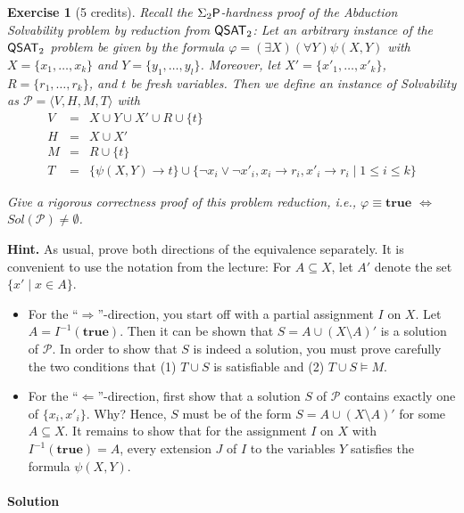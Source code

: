 \documentclass [11pt]{article}
\newcommand{\ra}{\rightarrow}
\newcommand{\Ra}{\Rightarrow}
\newcommand{\La}{\Leftarrow}
\newcommand{\LR}{\Leftrightarrow}
\renewcommand{\phi}{\varphi}
\newcommand{\ccfont}[1]{\protect\mathsf{#1}}
\newcommand{\Ptime}{\ccfont{P}}
\newcommand{\phs}[1]{\Sigma_{#1}\Ptime}
\newcommand{\QSAT}[1]{\ccfont{QSAT}_{#1}}
\newcommand{\True}{\mathbf{true}}
\newtheorem{exercise}[theorem]{Exercise}
\begin{document}
\noindent
\begin{exercise}[5 credits]
{\em 
Recall the $\phs{2}$-hardness proof of the Abduction Solvability problem by reduction from $\QSAT{2}$:
Let an arbitrary instance of the $\QSAT{2}$ problem be given by the formula 
$\phi =  (\exists X) (\forall Y) \psi(X,Y)$
with $X = \{x_1, \dots, x_k \}$ and $Y = \{y_1, \dots, y_l\}$. Moreover, let 
$X' = \{x'_1, \dots, x'_k \}$, $R = \{r_1, \dots, r_k \}$, and $t$ be fresh variables. 
Then we define an instance of Solvability as
$\mathcal{P}=\langle V,H,M,T \rangle$ with
%
\begin{eqnarray*}
V &=& X \cup Y  \cup X' \cup R \cup \{t\}\\
H &=& X \cup X' \\
M &=& R \cup \{t\}\\
T &=& \{ \psi(X,Y)\ra t \} 
\cup \{\neg x_i \vee \neg x'_i, x_i \ra r_i, x'_i \ra r_i \mid 1 \leq i \leq k\} 
\end{eqnarray*}
%

\smallskip
\noindent
Give a rigorous correctness proof of this problem reduction, i.e., 
$\phi \equiv \True$ $\LR$ $Sol(\mathcal{P}) \neq \emptyset$.

}%
\end{exercise}

\noindent
{\bf Hint.} As usual, prove both directions of the equivalence separately. It is convenient to use the notation from the lecture: For 
$A \subseteq X$, let $A'$  denote
the set $\{x' \mid x \in A\}$.

\begin{itemize}
\item 
For the ``$\Ra$''-direction, you start off with a partial assignment $I$ on $X$.
Let $A = I^{-1}(\True)$. Then it can be shown that $S = A \cup (X \setminus A)'$ 
is a solution of $\mathcal{P}$. In order to show that $S$ is indeed a solution, you must prove carefully the two conditions that (1) $T \cup S$ is satisfiable
and (2) $T \cup S \models M$. 

\item For the ``$\La$''-direction, first show that a solution $S$ of $\mathcal{P}$
contains exactly one  of $\{x_i, x'_i\}$. Why?  Hence, $S$ must be of the form
$S = A \cup (X \setminus A)'$ for some $A \subseteq X$.
It remains to show that for the assignment $I$ on $X$ with $I^{-1}(\True) = A$, 
every extension $J$ of $I$ to the variables $Y$ satisfies the formula $\psi(X,Y)$.
\end{itemize}


\paragraph*{Solution}
\end{document}
